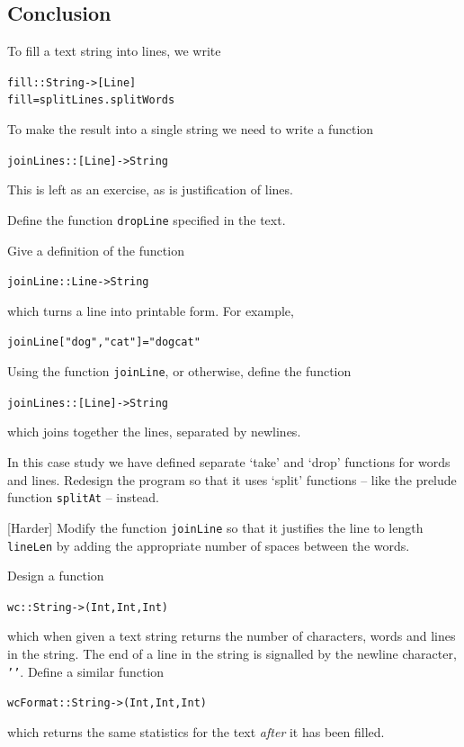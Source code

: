 \subsection*{Conclusion}

To fill a text string
into lines, we write
\begin{alltt}
fill :: String -> [Line]
fill = splitLines . splitWords
\end{alltt}
To make the result into a single string we need to write a function 
\begin{alltt}
joinLines :: [Line] -> String
\end{alltt}
This is left as an exercise, as is justification of lines.


\begin{exercises}

\item
Define the function \texttt{dropLine}
specified in the text.

\item
Give a definition of the function
\begin{alltt}
{\hskip1pc}joinLine :: Line -> String
\end{alltt}
which turns a line into printable form. For example,
\begin{alltt}
{\hskip1pc}joinLine [ "dog" , "cat" ] = "dog cat"
\end{alltt}

\item
Using the function \texttt{joinLine}, or otherwise, define the function
\begin{alltt}
{\hskip1pc}joinLines :: [Line] -> String
\end{alltt}
which joins together the lines, separated by newlines.

\item
In this case study we have defined separate `take' and `drop' functions for
words and lines.
Redesign the program so that it uses `split' functions -- like the prelude
function \texttt{splitAt} -- instead.

\item
{[Harder]} Modify the function \texttt{joinLine} so that it justifies the
line to length \texttt{lineLen} by adding the appropriate number of spaces
between the words. 

\item
Design a function
\begin{alltt}
{\hskip1pc}wc :: String -> (Int,Int,Int)
\end{alltt}
which when given a text string returns the number of characters, words and
lines in the string. The end of a line in the string is signalled by the
newline character, \texttt{''}. Define a similar function
\begin{alltt}
{\hskip1pc}wcFormat :: String -> (Int,Int,Int)
\end{alltt}
which returns the same statistics for the text {\em after\/} it has been
filled.


\end{exercises}
